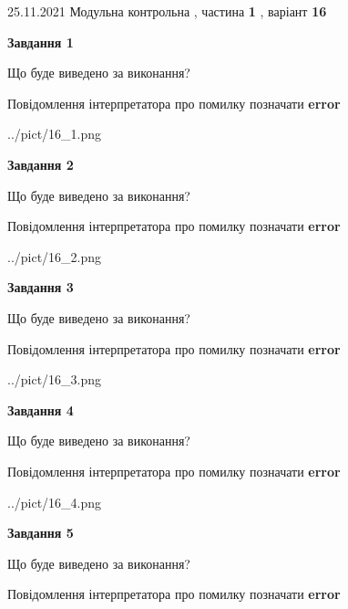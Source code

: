 \documentclass[10pt, ukrainian]{article}
\begin{document}
{25.11.2021 Модульна контрольна , частина \textbf { 1 }, варіант  \No \textbf { 16 }\par}
{
\begin {large}

{\begin {center}\textbf{Завдання 1}\end {center}}\par
Що буде виведено за виконання? \par
Повідомлення інтерпретатора про помилку позначати \textbf{error}

\begin{center}
	{../pict/16_1.png}
\end{center}
\newpage

{\begin {center}\textbf{Завдання 2}\end {center}}\par
Що буде виведено за виконання? \par
Повідомлення інтерпретатора про помилку позначати \textbf{error}

\begin{center}
	{../pict/16_2.png}
\end{center}
\newpage

{\begin {center}\textbf{Завдання 3}\end {center}}\par
Що буде виведено за виконання? \par
Повідомлення інтерпретатора про помилку позначати \textbf{error}

\begin{center}
	{../pict/16_3.png}
\end{center}
\newpage

{\begin {center}\textbf{Завдання 4}\end {center}}\par
Що буде виведено за виконання? \par
Повідомлення інтерпретатора про помилку позначати \textbf{error}

\begin{center}
	{../pict/16_4.png}
\end{center}
\newpage

{\begin {center}\textbf{Завдання 5}\end {center}}\par
Що буде виведено за виконання? \par
Повідомлення інтерпретатора про помилку позначати \textbf{error}


\end{large}}
\end{document}
